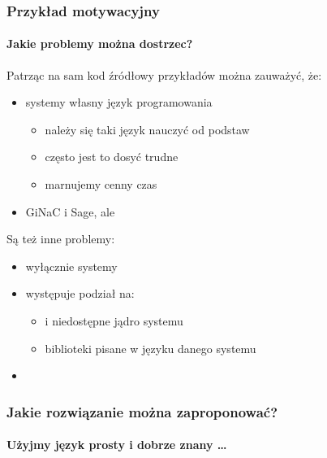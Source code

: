 \documentclass{beamer}
\begin{document}
\begin{frame}
    \frametitle{Przykład motywacyjny}
    \framesubtitle{Jakie problemy można dostrzec?}

    Patrząc na sam kod źródłowy przykładów można zauważyć, że:
    \begin{itemize}
        \item systemy  własny język programowania
            \begin{itemize}
                \item należy się taki język nauczyć od podstaw
                \item często jest to dosyć trudne
                \item marnujemy cenny czas
            \end{itemize}
            \pause
        \item {} GiNaC i Sage, ale \structure{\ldots}
    \end{itemize}
    \pause
    Są też inne problemy:
    \begin{itemize}
        \item wyłącznie systemy 
        \item występuje podział na:
            \begin{itemize}
                \item {} i niedostępne jądro systemu
                \item biblioteki pisane w języku danego systemu
            \end{itemize}
        \item \structure{\ldots}
    \end{itemize}
\end{frame}

\begin{frame}[fragile]
    \frametitle{Jakie rozwiązanie można zaproponować?}
    \framesubtitle{Użyjmy język prosty i dobrze znany \ldots}

    
\end{frame}
\end{document}
